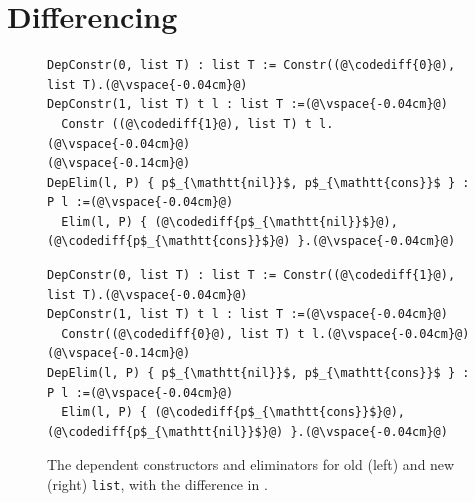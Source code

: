 \section{Differencing}
\label{sec:pi-diff}


\begin{figure}
\begin{minipage}{0.48\textwidth}
\begin{lstlisting}
DepConstr(0, list T) : list T := Constr((@\codediff{0}@), list T).(@\vspace{-0.04cm}@)
DepConstr(1, list T) t l : list T :=(@\vspace{-0.04cm}@)
  Constr ((@\codediff{1}@), list T) t l.(@\vspace{-0.04cm}@)
(@\vspace{-0.14cm}@)
DepElim(l, P) { p$_{\mathtt{nil}}$, p$_{\mathtt{cons}}$ } : P l :=(@\vspace{-0.04cm}@)
  Elim(l, P) { (@\codediff{p$_{\mathtt{nil}}$}@), (@\codediff{p$_{\mathtt{cons}}$}@) }.(@\vspace{-0.04cm}@)
\end{lstlisting}
\end{minipage}
\hfill
\begin{minipage}{0.48\textwidth}
\begin{lstlisting}
DepConstr(0, list T) : list T := Constr((@\codediff{1}@), list T).(@\vspace{-0.04cm}@)
DepConstr(1, list T) t l : list T :=(@\vspace{-0.04cm}@)
  Constr((@\codediff{0}@), list T) t l.(@\vspace{-0.04cm}@)
(@\vspace{-0.14cm}@)
DepElim(l, P) { p$_{\mathtt{nil}}$, p$_{\mathtt{cons}}$ } : P l :=(@\vspace{-0.04cm}@)
  Elim(l, P) { (@\codediff{p$_{\mathtt{cons}}$}@), (@\codediff{p$_{\mathtt{nil}}$}@) }.(@\vspace{-0.04cm}@)
\end{lstlisting}
\end{minipage}
\vspace{-0.3cm}
\caption{The dependent constructors and eliminators for old (left) and new (right) \lstinline{list}, with the difference in .}
\vspace{-0.1cm}
\label{fig:listconfig}
\end{figure}

